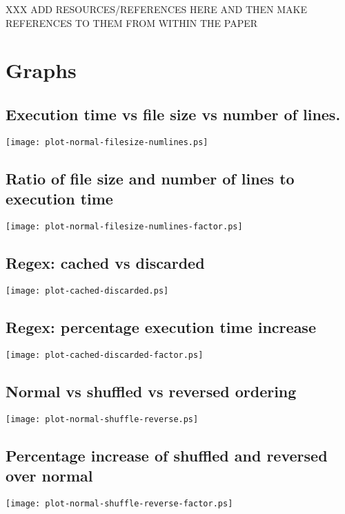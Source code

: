 \documentclass[a4paper,12pt,draft]{article}
\begin{document}
XXX ADD RESOURCES/REFERENCES HERE AND THEN MAKE REFERENCES TO THEM FROM WITHIN THE PAPER

\label{bibliography}


\section{Graphs}

\label{graphs}

\subsection{Execution time vs file size vs number of lines.}
\label{execution time vs file size vs number lines}
\texttt{[image: plot-normal-filesize-numlines.ps]}


\subsection{Ratio of file size and number of lines to execution time}
\label{execution time vs file size vs number lines factor}
\texttt{[image: plot-normal-filesize-numlines-factor.ps]}


\subsection{Regex: cached vs discarded}
\label{normal regex vs discard regex}
\texttt{[image: plot-cached-discarded.ps]}


\subsection{Regex: percentage execution time increase}
\label{normal regex vs disarded regex factor}
\texttt{[image: plot-cached-discarded-factor.ps]}


\subsection{Normal vs shuffled vs reversed ordering}
\label{normal vs shuffled vs reversed ordering}
\texttt{[image: plot-normal-shuffle-reverse.ps]}

\subsection{Percentage increase of shuffled and reversed over normal}
\label{normal vs shuffled vs reversed ordering factor}
\texttt{[image: plot-normal-shuffle-reverse-factor.ps]}
\end{document}
